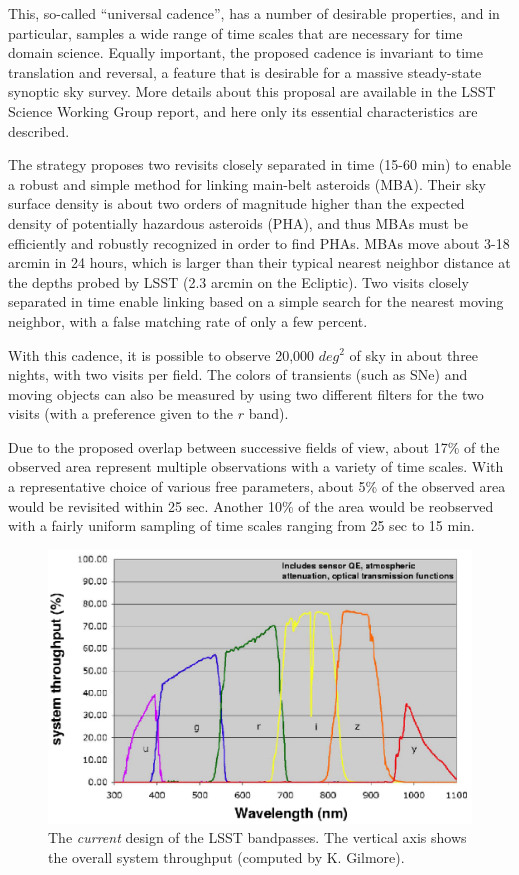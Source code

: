This, so-called ``universal cadence'', has a number of desirable properties,
and in particular, samples a wide range of time scales that are necessary for
time domain science. Equally important, the proposed cadence is invariant to
time translation and reversal, a feature that is desirable for a massive
steady-state synoptic sky survey. More details about this proposal are available
in the LSST Science Working Group report, and here only its essential
characteristics are described.

The strategy proposes two revisits closely separated in time (15-60 min)
to enable a robust and simple method for linking main-belt asteroids (MBA).
Their sky surface density is about two orders of magnitude higher than the
expected density of potentially hazardous asteroids (PHA), and thus MBAs
must be efficiently and robustly recognized in order to find PHAs. MBAs
move about 3-18 arcmin in 24 hours, which is larger than their typical
nearest neighbor distance at the depths probed by LSST (2.3 arcmin on the
Ecliptic). Two visits closely separated in time enable linking based on
a simple search for the nearest moving neighbor, with a false matching
rate of only a few percent.

With this cadence, it is possible to observe 20,000 $deg^2$ of sky
in about three nights, with two visits per field. The colors of
transients (such as SNe) and moving objects can also be measured by
using two different filters for the two visits (with a preference given
to the $r$ band).

Due to the proposed overlap between successive fields of view, about
17\% of the observed area represent multiple observations with a variety
of time scales. With a representative choice of various free parameters,
about 5\% of the observed area would be revisited within 25 sec.
Another 10\% of the area would be reobserved with a fairly uniform
sampling of time scales ranging from 25 sec to 15 min.

\newpage
{}

\bigskip

\begin{figure}[h]\centering
\includegraphics[width=\textwidth]{lsstfilters.ps}
\caption{The {\it current} design of the LSST bandpasses. The vertical
axis shows the overall system throughput (computed by K. Gilmore).}
\end{figure}


